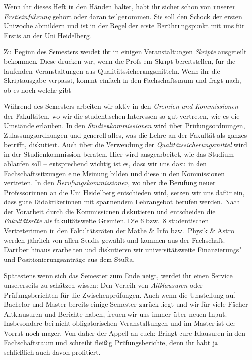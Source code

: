 Wenn ihr dieses Heft in den Händen haltet, habt ihr sicher schon von unserer \emph{Erstieinführung} gehört oder daran teilgenommen. Sie soll den Schock der ersten Uniwoche abmildern und ist in der Regel der erste Berührungspunkt mit uns für Erstis an der Uni Heidelberg.

Zu Beginn des Semesters werdet ihr in einigen Veranstaltungen \emph{Skripte} ausgeteilt bekommen. Diese drucken wir, wenn die Profs ein Skript bereitstellen, für die laufenden Veranstaltungen aus Qualitätssicherungsmitteln. Wenn ihr die Skriptausgabe verpasst, kommt einfach in den Fachschaftsraum und fragt nach, ob es noch welche gibt.

Während des Semesters arbeiten wir aktiv in den \emph{Gremien und Kommissionen} der Fakultäten, wo wir die studentischen Interessen so gut vertreten, wie es die Umstände erlauben. In den \emph{Studienkommissionen} wird über Prüfungsordnungen, Zulassungsordnungen und generell alles, was die Lehre an der Fakultät als ganzes betrifft, diskutiert. Auch über die Verwendung der \emph{Qualitätssicherungsmittel} wird in der Studienkommission beraten. Hier wird ausgearbeitet, wie das Studium ablaufen soll -- entsprechend wichtig ist es, dass wir uns dazu in den Fachschaftssitzungen eine Meinung bilden und diese in den Kommissionen vertreten. In den \emph{Berufungskommissionen}, wo über die Berufung neuer Professorinnen an die Uni Heidelberg entschieden wird, setzen wir uns dafür ein, dass gute Didaktikerinnen mit spannendem Lehrangebot berufen werden. Nach der Vorarbeit durch die Kommissionen diskutieren und entscheiden die \emph{Fakultätsräte} als fakultätsweite Gremien. Die 6 bzw.~8 studentischen Vertreterinnen in den Fakultätsräten der Mathe \& Info bzw.~Physik \& Astro werden jährlich von allen Studis gewählt und kommen aus der Fachschaft. Darüber hinaus erarbeiten und diskutieren wir universitätsweite Finanzierungs"= und Positionierungsanträge aus dem \gls{StuRa}.

Spätestens wenn sich das Semester zum Ende neigt, werdet ihr einen Service unsererseits zu schätzen wissen: Den Verleih von \emph{Altklausuren} oder Prüfungsberichten für die Zwischenprüfungen. Auch wenn die Umstellung auf Bachelor und Master bereits einige Semester zurück liegt und wir für viele Fächer Altklausuren und Berichte haben, freuen wir uns immer über neuen Input. Insbesondere bei nicht obligatorischen Veranstaltungen und im Master ist der Vorrat noch mager. Von daher der Appell an euch: Bringt eure Klausuren in den Fachschaftsraum und schreibt fleißig Prüfungsberichte, denn ihr habt ja schließlich auch davon profitiert.


